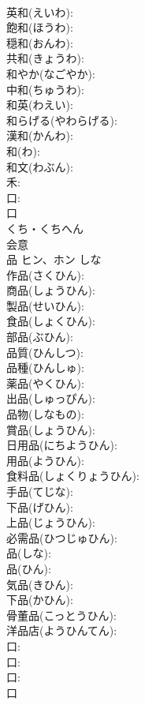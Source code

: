 \documentclass[8pt]{extreport}
\begin{document}
\begin{CJK}{UTF8}{min}
\\	英和(えいわ): 
\\	飽和(ほうわ): 
\\	穏和(おんわ): 
\\	共和(きょうわ): 
\\	和やか(なごやか): 
\\	中和(ちゅうわ): 
\\	和英(わえい): 
\\	和らげる(やわらげる): 
\\	漢和(かんわ): 
\\	和(わ): 
\\	和文(わぶん): 
\\	禾: 
\\	口: 
\\	口	
\\	くち・くちへん	
\\	会意 
\\	品	ヒン、ホン	しな		
\\	作品(さくひん): 
\\	商品(しょうひん): 
\\	製品(せいひん): 
\\	食品(しょくひん): 
\\	部品(ぶひん): 
\\	品質(ひんしつ): 
\\	品種(ひんしゅ): 
\\	薬品(やくひん): 
\\	出品(しゅっぴん): 
\\	品物(しなもの): 
\\	賞品(しょうひん): 
\\	日用品(にちようひん): 
\\	用品(ようひん): 
\\	食料品(しょくりょうひん): 
\\	手品(てじな): 
\\	下品(げひん): 
\\	上品(じょうひん): 
\\	必需品(ひつじゅひん): 
\\	品(しな): 
\\	品(ひん): 
\\	気品(きひん): 
\\	下品(かひん): 
\\	骨董品(こっとうひん): 
\\	洋品店(ようひんてん): 
\\	口: 
\\	口: 
\\	口: 
\\	口	

\end{CJK}
\end{document}
